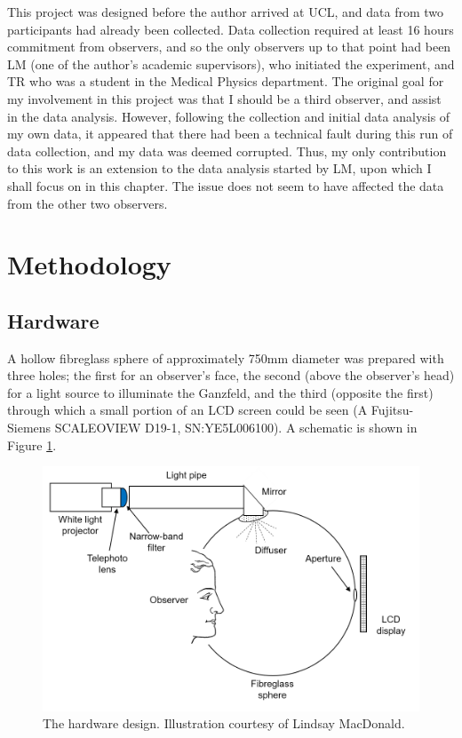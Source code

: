 This project was designed before the author arrived at \gls{UCL}, and data from two participants had already been collected. Data collection required at least 16 hours commitment from observers, and so the only observers up to that point had been LM (one of the author's academic supervisors), who initiated the experiment, and TR who was a student in the Medical Physics department. The original goal for my involvement in this project was that I should be a third observer, and assist in the data analysis. However, following the collection and initial data analysis of my own data, it appeared that there had been a technical fault during this run of data collection, and my data was deemed corrupted. Thus, my only contribution to this work is an extension to the data analysis started by LM, upon which I shall focus on in this chapter. The issue does not seem to have affected the data from the other two observers.

\section{Methodology}

\subsection{Hardware}

A hollow fibreglass sphere of approximately 750mm diameter was prepared with three holes; the first for an observer's face, the second (above the observer's head) for a light source to illuminate the Ganzfeld, and the third (opposite the first) through which a small portion of an LCD screen could be seen (A Fujitsu-Siemens SCALEOVIEW D19-1, SN:YE5L006100). A schematic is shown in Figure \ref{fig:sketch}.

\begin{figure}[htbp]
\includegraphics[max width=\textwidth]{figs/LargeSphere/sketch.png}
\caption{The hardware design. Illustration courtesy of Lindsay MacDonald.}
\label{fig:sketch}
\end{figure}

